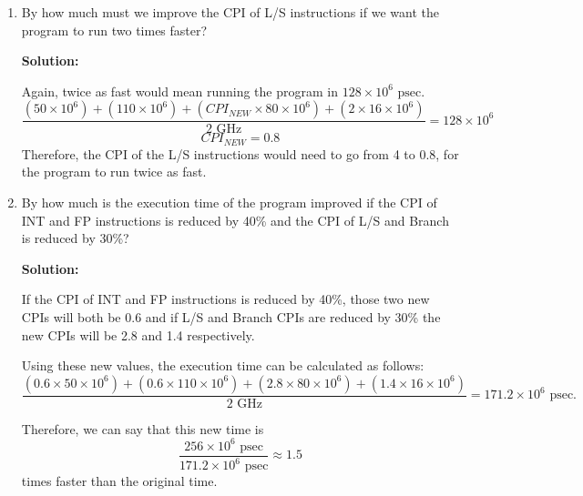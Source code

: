 \documentclass[10pt]{article} %
\begin{document}
\begin{enumerate}
\begin{enumerate} [a]
So, two find the new CPI for FP instructions for the program to run twice as fast, we set the original equation equal to $128 \times 10^6$, since that's half of the execution time, and solve for the new CPI:
$$ \dfrac{(CPI_{NEW} \times 50 \times 10^6) + (110 \times 10^6) + (4 \times 80 \times 10^6) + (2 \times 16 \times 10^6)}{2 \text { GHz}} = 128 \times 10^6 $$
$$ CPI_{NEW} = \dfrac{-103}{25} $$
Since the new CPI value we found is negative, and that's the only solution to the equation, we conclude that it is not possible to reduce the CPI enough to make the program run twice as fast.  

\item By how much must we improve the CPI of L/S instructions if we want the program to run two times faster?

\textbf{Solution: }

Again, twice as fast would mean running the program in $128 \times 10^6 \text{ psec}$.  
$$ \dfrac{(50 \times 10^6) + (110 \times 10^6) + (CPI_{NEW} \times 80 \times 10^6) + (2 \times 16 \times 10^6)}{2 \text { GHz}} = 128 \times 10^6 $$
$$ CPI_{NEW} = 0.8 $$
Therefore, the CPI of the L/S instructions would need to go from 4 to 0.8, for the program to run twice as fast.  

\item By how much is the execution time of the program improved if the CPI of INT and FP instructions is reduced by 40\% and the CPI of L/S and Branch is reduced by 30\%?

\textbf{Solution: }

If the CPI of INT and FP instructions is reduced by 40\%, those two new CPIs will both be 0.6 and if L/S and Branch CPIs are reduced by 30\% the new CPIs will be 2.8 and 1.4 respectively.  

Using these new values, the execution time can be calculated as follows:
$$ \dfrac{(0.6 \times 50 \times 10^6) + (0.6 \times 110 \times 10^6) + (2.8 \times 80 \times 10^6) + (1.4 \times 16 \times 10^6)}{2 \text{ GHz}} = 171.2 \times 10^6 \text{ psec.}$$

Therefore, we can say that this new time is $$ \dfrac{256 \times 10^6 \text{ psec}}{171.2 \times 10^6 \text{ psec}} \approx 1.5 $$ times faster than the original time.  

\end{enumerate}

\end{enumerate}
\end{document}
